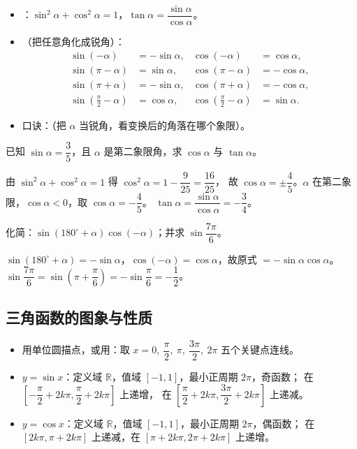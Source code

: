 \begin{explore}
\begin{itemize}
  \item {}：$\sin^2\alpha+\cos^2\alpha=1$，$\tan\alpha=\dfrac{\sin\alpha}{\cos\alpha}$。
  \item {}（把任意角化成锐角）：
        \[
          \begin{aligned}
            \sin(-\alpha)&=-\sin\alpha, & \cos(-\alpha)&=\cos\alpha,\\
            \sin(\pi-\alpha)&=\sin\alpha, & \cos(\pi-\alpha)&=-\cos\alpha,\\
            \sin(\pi+\alpha)&=-\sin\alpha, & \cos(\pi+\alpha)&=-\cos\alpha,\\
            \sin\!\left(\frac{\pi}{2}-\alpha\right)&=\cos\alpha, &
            \cos\!\left(\frac{\pi}{2}-\alpha\right)&=\sin\alpha.
          \end{aligned}
        \]
  \item 口诀：（把 $\alpha$ 当锐角，看变换后的角落在哪个象限）。
\end{itemize}

\begin{example}
已知 $\sin\alpha=\dfrac35$，且 $\alpha$ 是第二象限角，求 $\cos\alpha$ 与 $\tan\alpha$。
\end{example}
\begin{solution}
由 $\sin^2\alpha+\cos^2\alpha=1$ 得 $\cos^2\alpha=1-\dfrac{9}{25}=\dfrac{16}{25}$，
故 $\cos\alpha=\pm\dfrac45$。$\alpha$ 在第二象限，$\cos\alpha<0$，取 $\cos\alpha=-\dfrac45$。
$\tan\alpha=\dfrac{\sin\alpha}{\cos\alpha}=-\dfrac34$。
\end{solution}

\begin{problem}
化简：$\sin(180^\circ+\alpha)\cos(-\alpha)$；并求 $\sin\dfrac{7\pi}{6}$。
\end{problem}
\begin{solution}
$\sin(180^\circ+\alpha)=-\sin\alpha$，$\cos(-\alpha)=\cos\alpha$，故原式 $=-\sin\alpha\cos\alpha$。
$\sin\dfrac{7\pi}{6}=\sin\left(\pi+\dfrac{\pi}{6}\right)=-\sin\dfrac{\pi}{6}=-\dfrac12$。
\end{solution}

\subsection{三角函数的图象与性质}

\begin{itemize}
  \item 用单位圆描点，或用：取 $x=0,\ \dfrac{\pi}{2},\ \pi,\ \dfrac{3\pi}{2},\ 2\pi$
        五个关键点连线。
  \item $y=\sin x$：定义域 $\mathbb{R}$，值域 $[-1,1]$，最小正周期 $2\pi$，奇函数；
        在 $\left[-\dfrac{\pi}{2}+2k\pi,\dfrac{\pi}{2}+2k\pi\right]$ 上递增，
        在 $\left[\dfrac{\pi}{2}+2k\pi,\dfrac{3\pi}{2}+2k\pi\right]$ 上递减。
  \item $y=\cos x$：定义域 $\mathbb{R}$，值域 $[-1,1]$，最小正周期 $2\pi$，偶函数；
        在 $[2k\pi,\pi+2k\pi]$ 上递减，在 $[\pi+2k\pi,2\pi+2k\pi]$ 上递增。
\end{itemize}


\end{explore}
